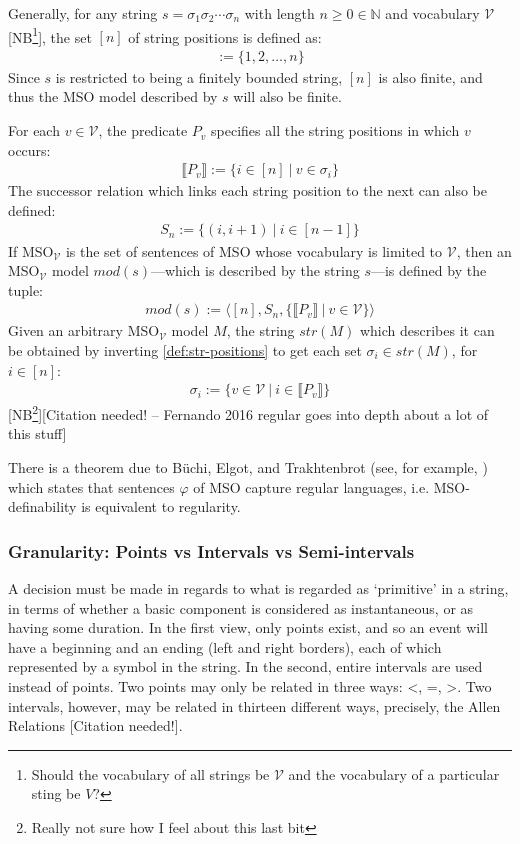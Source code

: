 \documentclass[a4paper,12pt,leqno]{article}
\renewcommand{\phi}{\varphi}
\newcommand{\citeneeded}[1][]{{\color{red}[Citation needed!#1]}}
\newcommand{\selfnote}[1]{{\color{red}[NB\footnote{{\color{red}#1}}]}}
\newcommand{\nb}{\selfnote}
\begin{document}
Generally, for any string $s = \sigma_1\sigma_2\cdots\sigma_n$ with length $n \ge 0 \in \mathbb{N}$ and vocabulary $\mathcal{V}$ \nb{Should the vocabulary of all strings be $\mathcal{V}$ and the vocabulary of a particular sting be $V$?}, the set $[n]$ of string positions is defined as:
\begin{align}
	[n] := \{1,2,\ldots,n\}
\end{align}
Since $s$ is restricted to being a finitely bounded string, $[n]$ is also finite, and thus the MSO model described by $s$ will also be finite.

For each $v \in \mathcal{V}$, the predicate $P_v$ specifies all the string positions in which $v$ occurs:
\begin{align}\label{def:str-positions}
	\llbracket P_v \rrbracket := \{i \in [n] ~|~ v \in \sigma_i\}
\end{align}
The successor relation which links each string position to the next can also be defined:
\begin{align}
	S_n := \{(i, i+1) ~|~ i \in [n - 1]\}
\end{align}
If MSO$_{\mathcal{V}}$ is the set of sentences of MSO whose vocabulary is limited to $\mathcal{V}$, then an MSO$_{\mathcal{V}}$ model $mod(s)$---which is described by the string $s$---is defined by the tuple:
\begin{align}
	mod(s) := \langle [n], S_n, \{\llbracket P_v \rrbracket ~|~ v \in \mathcal{V}\} \rangle
\end{align}
Given an arbitrary MSO$_{\mathcal{V}}$ model $M$, the string $str(M)$ which describes it can be obtained by inverting \cref{def:str-positions} to get each set $\sigma_i \in str(M)$, for $i \in [n]$:
\begin{align}
	\sigma_i := \{v \in \mathcal{V} ~|~ i \in \llbracket P_v \rrbracket \}
\end{align}
\nb{Really not sure how I feel about this last bit}\citeneeded[ -- Fernando 2016 regular goes into depth about a lot of this stuff]

There is a theorem due to B\"{u}chi, Elgot, and Trakhtenbrot (see, for example, \citet[p.124, Theorem 7.21]{Libkin2004}) which states that sentences $\phi$ of MSO capture regular languages, i.e. MSO-definability is equivalent to regularity.

\subsubsection{Granularity: Points vs Intervals vs Semi-intervals}\label{ssub:granularity}
A decision must be made in regards to what is regarded as `primitive' in a string, in terms of whether a basic component is considered as instantaneous, or as having some duration. In the first view, only points exist, and so an event will have a beginning and an ending (left and right borders), each of which represented by a symbol in the string. In the second, entire intervals are used instead of points. Two points may only be related in three ways: \textless, =, \textgreater. Two intervals, however, may be related in thirteen different ways, precisely, the Allen Relations \citeneeded{}. 
\end{document}
